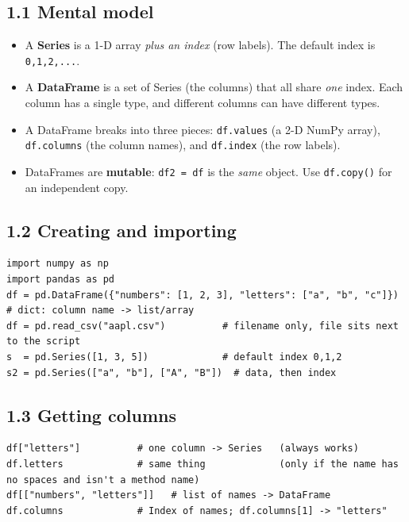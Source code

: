 \documentclass[10pt]{article}
\newcommand{\code}[1]{\lstinline[basicstyle=\ttfamily\small]{#1}}
\begin{document}
\subsection*{1.1 Mental model}
\begin{itemize}
\item A \textbf{Series} is a 1-D array \emph{plus an index} (row labels). The default index is \code{0,1,2,...}.
\item A \textbf{DataFrame} is a set of Series (the columns) that all share \emph{one} index. Each column has a single type, and different columns can have different types.
\item A DataFrame breaks into three pieces: \code{df.values} (a 2-D NumPy array), \code{df.columns} (the column names), and \code{df.index} (the row labels).
\item DataFrames are \textbf{mutable}: \code{df2 = df} is the \emph{same} object. Use \code{df.copy()} for an independent copy.
\end{itemize}

\subsection*{1.2 Creating and importing}
\begin{lstlisting}
import numpy as np
import pandas as pd
df = pd.DataFrame({"numbers": [1, 2, 3], "letters": ["a", "b", "c"]})  # dict: column name -> list/array
df = pd.read_csv("aapl.csv")          # filename only, file sits next to the script
s  = pd.Series([1, 3, 5])             # default index 0,1,2
s2 = pd.Series(["a", "b"], ["A", "B"])  # data, then index
\end{lstlisting}

\subsection*{1.3 Getting columns}
\begin{lstlisting}
df["letters"]          # one column -> Series   (always works)
df.letters             # same thing             (only if the name has no spaces and isn't a method name)
df[["numbers", "letters"]]   # list of names -> DataFrame
df.columns             # Index of names; df.columns[1] -> "letters"
\end{lstlisting}
\end{document}
